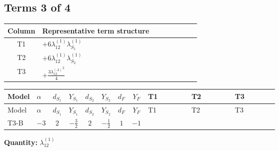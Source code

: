 \documentclass[8pt]{article}
\begin{document}
\begin{landscape}
\subsection*{Terms 3 of 4}
\begin{center}
\begin{tabular}{@{}c >{\raggedright\arraybackslash}p{0.82\linewidth}@{}}
\toprule
Column & Representative term structure \\
\midrule
T1 & \(\displaystyle +6 {\lambda_{12}^{(1)}} {\lambda_{S_1}^{(1)}}\) \\
\midrule
T2 & \(\displaystyle +6 {\lambda_{12}^{(1)}} {\lambda_{S_2}^{(1)}}\) \\
\midrule
T3 & \(\displaystyle +\frac{3 {\lambda_{12}^{(A)}}^2}{4}\) \\
\midrule
\bottomrule
\end{tabular}
\end{center}
\smallskip
\tiny
\begin{longtable}{@{}llcccccc >{\raggedright\arraybackslash}p{0.21\linewidth} >{\raggedright\arraybackslash}p{0.21\linewidth} >{\raggedright\arraybackslash}p{0.21\linewidth}@{}}
\toprule
Model & $\alpha$ & $d_{S_1}$ & $Y_{S_1}$ & $d_{S_2}$ & $Y_{S_2}$ & $d_F$ & $Y_F$ & T1 & T2 & T3 \\
\midrule
\endfirsthead
\toprule
Model & $\alpha$ & $d_{S_1}$ & $Y_{S_1}$ & $d_{S_2}$ & $Y_{S_2}$ & $d_F$ & $Y_F$ & T1 & T2 & T3 \\
\midrule
\endhead
T3-B & $-3$ & $2$ & $-\frac{3}{2}$ & $2$ & $-\frac{1}{2}$ & $1$ & $-1$ & \scriptsize\adjustbox{max width=\linewidth}{$\begin{gathered} +6 {\lambda_{12}^{(1)}} {\lambda_{S_1}^{(1)}}\end{gathered}$} & \scriptsize\adjustbox{max width=\linewidth}{$\begin{gathered} +6 {\lambda_{12}^{(1)}} {\lambda_{S_2}^{(1)}}\end{gathered}$} & \scriptsize\adjustbox{max width=\linewidth}{$\begin{gathered} +\frac{3 {\lambda_{12}^{(A)}}^2}{4}\end{gathered}$} \\
\midrule
\bottomrule
\end{longtable}
\clearpage
\noindent\textbf{Quantity: }$\lambda_{12}^{(1)}$\par\smallskip

\end{landscape}
\end{document}
